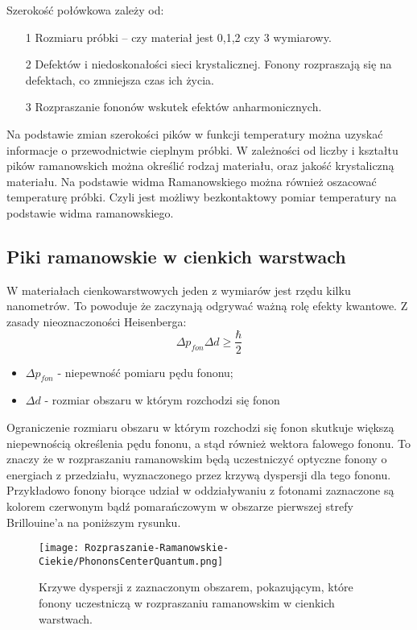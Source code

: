 Szerokość połówkowa zależy od:
\begin{itemize}
	\item[1]{Rozmiaru próbki -- czy materiał jest 0,1,2 czy 3 wymiarowy.}
	\item[2]{Defektów i niedoskonałości sieci krystalicznej. Fonony rozpraszają się na defektach, co zmniejsza czas ich życia.}
	\item[3]{Rozpraszanie fononów wskutek efektów anharmonicznych.}
\end{itemize}
Na podstawie zmian szerokości pików w funkcji temperatury można uzyskać informacje o przewodnictwie cieplnym próbki. 
W zależności od liczby i kształtu pików ramanowskich można określić rodzaj materiału, oraz jakość krystaliczną materiału.
Na podstawie widma Ramanowskiego można również oszacować temperaturę próbki. Czyli jest możliwy bezkontaktowy pomiar temperatury na podstawie widma ramanowskiego.

\subsection{Piki ramanowskie w cienkich warstwach}
W materiałach cienkowarstwowych jeden z wymiarów jest rzędu kilku nanometrów. To powoduje że zaczynają odgrywać ważną rolę efekty kwantowe. Z zasady nieoznaczoności Heisenberga:
\begin{equation}
	\Delta p_{fon} \Delta d \geq \frac{\hbar}{2}
\end{equation}
\begin{itemize}
	\item{$\Delta p_{fon}$ - niepewność pomiaru pędu fononu};
	\item{$\Delta d$ - rozmiar obszaru w którym rozchodzi się fonon}
\end{itemize}
Ograniczenie rozmiaru obszaru w którym rozchodzi się fonon skutkuje większą niepewnością określenia pędu fononu, a stąd również wektora falowego fononu. To znaczy że w rozpraszaniu ramanowskim będą uczestniczyć optyczne fonony o  energiach z przedziału, wyznaczonego przez krzywą dyspersji dla tego fononu. Przykładowo fonony biorące udział w oddziaływaniu z fotonami zaznaczone są kolorem czerwonym bądź pomarańczowym w obszarze pierwszej strefy Brillouine'a na poniższym rysunku.

\begin{figure}[H]
	\begin{center}
		\texttt{[image: Rozpraszanie-Ramanowskie-Ciekie/PhononsCenterQuantum.png]}
		\caption{Krzywe dyspersji z zaznaczonym obszarem, pokazującym, które fonony uczestniczą w rozpraszaniu ramanowskim w cienkich warstwach.}
	\end{center}
\end{figure}

